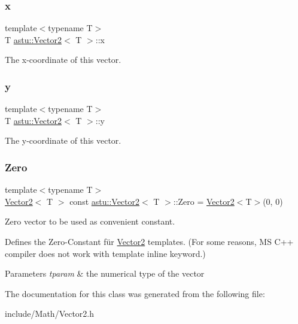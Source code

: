 \subsubsection{\texorpdfstring{x}{x}}
{\footnotesize\ttfamily template$<$typename T$>$ \\
T \hyperlink{classastu_1_1Vector2}{astu\+::\+Vector2}$<$ T $>$\+::x}

The x-\/coordinate of this vector. \mbox{\label{classastu_1_1Vector2_a6718f5a7005c38830dbd31283a87f5c9}} 
\subsubsection{\texorpdfstring{y}{y}}
{\footnotesize\ttfamily template$<$typename T$>$ \\
T \hyperlink{classastu_1_1Vector2}{astu\+::\+Vector2}$<$ T $>$\+::y}

The y-\/coordinate of this vector. \mbox{\label{classastu_1_1Vector2_adba359bd590f9b4f43623c817c7f5e46}} 
\subsubsection{\texorpdfstring{Zero}{Zero}}
{\footnotesize\ttfamily template$<$typename T$>$ \\
\hyperlink{classastu_1_1Vector2}{Vector2}$<$ T $>$ const \hyperlink{classastu_1_1Vector2}{astu\+::\+Vector2}$<$ T $>$\+::Zero = \hyperlink{classastu_1_1Vector2}{Vector2}$<$T$>$(0, 0)\hspace{0.3cm}{\ttfamily [static]}}

Zero vector to be used as convenient constant.

Defines the Zero-\/\+Constant für \hyperlink{classastu_1_1Vector2}{Vector2} templates. (For some reasons, MS C++ compiler does not work with template inline keyword.)


\begin{DoxyParams}{Parameters}
{\em tparam} & the numerical type of the vector \\
\hline
\end{DoxyParams}


The documentation for this class was generated from the following file\+:\begin{DoxyCompactItemize}
\item 
include/\+Math/Vector2.\+h\end{DoxyCompactItemize}
